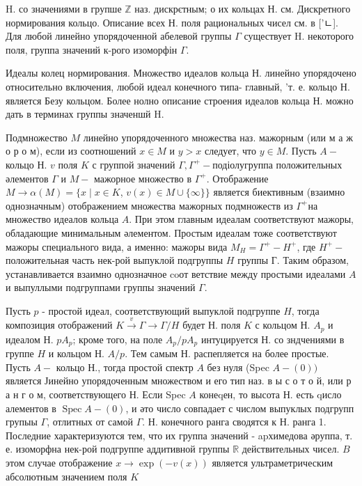 \documentclass[10pt]{article}
\begin{document}
H. со значениями в групше $\mathbb{Z}$ наз. дискрєтным; о их кольцах Н. см. Дискретного нормирования кольцо. Описание всех Н. поля рациональных чисел см. в ['ㄴ]. Для любой линейно упорядоченной абелевой группы $\Gamma$ существует $\mathrm{H}$. некоторого поля, группа значений к-рого изоморфін $\Gamma$.



Идеалы колец нормирования. Множество идеалов кольца Н. линейно упорядочено относительно включения, любой идеал конечного типа- главный, 'т. е. кольцо Н. является Безу кольцом. Более нолно описание строения идеалов кольца Н. можно дать в терминах группы значеншй $\mathrm{H}$.



Подмножество $M$ линейно упорядоченного множества наз. мажорным (или м а ж о р о м), если из соотношений $x \in M$ и $y>x$ следует, что $y \in M$. Пусть $A-$ кольцо Н. $v$ поля $K$ с группой значений $\Gamma, \Gamma^{+}-$подіолугруппа положительных әлементов $\Gamma$ и $M-$ мажорное множество в $\Gamma^{+}$. Отображение $M \rightarrow \alpha(M)=\{x \mid x \in K$, $v(x) \in M \cup\{\infty\}\}$ является биективным (взаимно однозначным) отображением множества мажорных подмножеств из $\Gamma^{+}$на множество идеалов кольца $A$. При этом главным идеалам соответствуют мажоры, обладающие минимальным әлементом. Простым идеалам тоже соответствуют мажоры специального вида, а именно: мажоры вида $M_{H}=\Gamma^{+}-H^{+}$, где $H^{+}-$положительная часть нек-рой выпуклой подгруппы $H$ группы Г. Таким образом, устанавливается взаимно однозначное coот ветствие между простыми идеалами $A$ и выпуллыми подгруппами группы значений $\Gamma$.



Пусть $p$ - простой идеал, соответствующий выпуклой подгруппе $H$, тогда композиция отображений $K \stackrel{v}{\rightarrow} \Gamma \rightarrow \Gamma / H$ будет Н. поля $K$ с кольцом Н. $A_{p}$ и идеалом Н. $p A_{p}$; кроме того, на поле $A_{p} / p A_{p}$ интуцируется Н. со зндчениями в группе $H$ и кольцом Н. $A / p$. Тем самым Н. распепляется на более простые. Пусть $A-$ кольцо Н., тогда простой спектр $A$ без нуля (Spec $A-(0))$ является Јинейно упорядоченным множеством и его тип наз. в ы с о т о й, или р а н г о м, соответствующего Н. Если Spec $A$ конеqен, то высота Н. есть qисло алементов в $\operatorname{Spec} A-(0)$, и әто число совпадает с числом выпуклых подгрупп групыы $\Gamma$, отлитных от самой $\Gamma$. Н. конечного ранга сводятся к Н. ранга 1. Последние характеризуются тем, что их группа значений - apхимедова әруппа, т. е. изоморфна нек-рой подгруппе аддитивной группы $\mathbb{R}$ действительных чисел. $B$ этом случае отображение $x \rightarrow \exp (-v(x))$ является ультраметрическим абсолютным значением поля $K$
\end{document}
